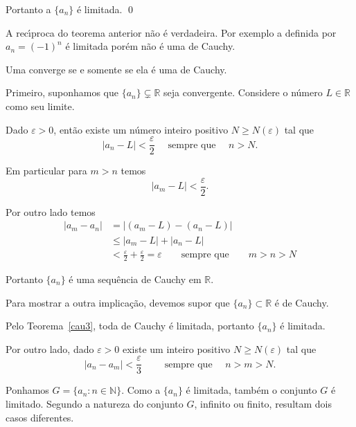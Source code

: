 Portanto a \seq $\{a_n\}$ \'{e} limitada. \qed

\begin{obs}
A rec\'{\i}proca do teorema anterior n\~{a}o \'{e} verdadeira. Por exemplo a
\seq definida por  $a_n=(-1)^n$ \'{e} limitada por\'{e}m n\~{a}o \'{e} uma \seq de
Cauchy.
\end{obs}

\begin{fteo}
Uma \seq converge se e somente se ela \'{e} uma \seq de Cauchy.
\end{fteo}

\prova Primeiro, suponhamos que $\{a_n\}\subsetneq \mathbb{R}$ seja convergente.
Considere o n\'{u}mero $L\in \mathbb{R}$ como seu limite.

Dado $\varepsilon>0$, ent\~{a}o existe um n\'{u}mero inteiro positivo  $N\geq N(\varepsilon)$ tal que
\begin{equation*}
    |a_n-L|<\frac{\varepsilon}{2}\quad \text{ sempre que }\quad n>N.
\end{equation*}

Em particular para $m>n$ temos
\begin{equation*}
|a_m-L|<\frac{\varepsilon}{2}.
\end{equation*}

Por outro lado temos
\begin{align*}
    |a_m-a_n|&=|(a_m-L)-(a_n-L)|\\[2ex]
    &\leq |a_m-L|+|a_n-L|\\[2ex]
    &<\frac{\varepsilon}{2}+\frac{\varepsilon}{2}=\varepsilon\qquad\text{sempre que}\qquad m>n>N
\end{align*}

Portanto $\{a_n\}$ \'{e} uma sequ\^{e}ncia de Cauchy em $\mathbb{R}$.

Para mostrar a outra implica\c{c}\~{a}o, devemos supor que $\{a_n\}\subset
\mathbb{R}$ \'{e} de Cauchy.

Pelo Teorema~\ref{cau3}, toda \seq de Cauchy \'{e} limitada, portanto
$\{a_n\}$ \'{e} limitada.

Por outro lado, dado $\varepsilon>0$ existe um inteiro positivo $N\geq N(\varepsilon)$ tal que
\begin{equation}\label{cau4}
    |a_n-a_m|<\frac{\varepsilon}{3}\qquad \text{ sempre que }\quad n>m>N.
\end{equation}

Ponhamos $G=\{a_n\colon n\in \mathbb{N}\}$. Como a \seq $\{a_n\}$ \'{e}
limitada, tamb\'{e}m o conjunto $G$ \'{e} limitado. Segundo a natureza do
conjunto $G$, infinito ou finito,  resultam dois casos diferentes.


